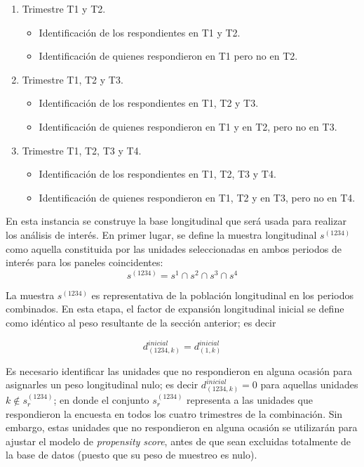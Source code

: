 \documentclass[
  12pt,
  spanish,
]{book}
\providecommand{\tightlist}{%
  \setlength{\itemsep}{0pt}\setlength{\parskip}{0pt}}
\begin{document}
\begin{enumerate}
\def\labelenumi{\arabic{enumi}.}
\tightlist
\item
  Trimestre T1 y T2.

  \begin{itemize}
  \tightlist
  \item
    Identificación de los respondientes en T1 y T2.
  \item
    Identificación de quienes respondieron en T1 pero no en T2.
  \end{itemize}
\item
  Trimestre T1, T2 y T3.

  \begin{itemize}
  \tightlist
  \item
    Identificación de los respondientes en T1, T2 y T3.
  \item
    Identificación de quienes respondieron en T1 y en T2, pero no en T3.
  \end{itemize}
\item
  Trimestre T1, T2, T3 y T4.

  \begin{itemize}
  \tightlist
  \item
    Identificación de los respondientes en T1, T2, T3 y T4.
  \item
    Identificación de quienes respondieron en T1, T2 y en T3, pero no en T4.
  \end{itemize}
\end{enumerate}

En esta instancia se construye la base longitudinal que será usada para realizar los análisis de interés. En primer lugar, se define la muestra longitudinal \(s^{(1234)}\) como aquella constituida por las unidades seleccionadas en ambos periodos de interés para los paneles coincidentes:
\[
s^{(1234)}=s^1 \cap s^2 \cap s^3 \cap s^4
\]

La muestra \(s^{(1234)}\) es representativa de la población longitudinal en los periodos combinados. En esta etapa, el factor de expansión longitudinal inicial se define como idéntico al peso resultante de la sección anterior; es decir

\[
d_{(1234,k)}^{inicial}=d_{(1,k)}^{inicial}
\]

Es necesario identificar las unidades que no respondieron en alguna ocasión para asignarles un peso longitudinal nulo; es decir
\(d_{(1234,k)}^{inicial}=0\) para aquellas unidades \(k \notin s_r^{(1234)}\); en donde el conjunto \(s_r^{(1234)}\) representa a las unidades que respondieron la encuesta en todos los cuatro trimestres de la combinación. Sin embargo, estas unidades que no respondieron en alguna ocasión se utilizarán para ajustar el modelo de \emph{propensity score}, antes de que sean excluidas totalmente de la base de datos (puesto que su peso de muestreo es nulo).
\end{document}
